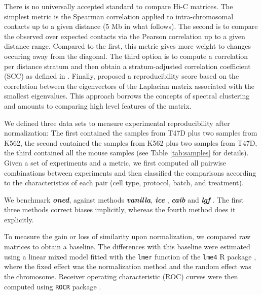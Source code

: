 \documentclass{bioinfo}
\begin{document}
\begin{methods}
There is no universally accepted standard to compare Hi-C matrices. The
simplest metric is the Spearman correlation applied to intra-chromosomal
contacts up to a given distance (5 Mb in what follows). The second is
to compare the observed over expected contacts via the Pearson correlation
up to a given distance range. Compared to the first, this metric gives
more weight to changes occuring away from the diagonal. The third option
is to compute a correlation per distance stratum and then obtain a
stratum-adjusted correlation coefficient (SCC) as defined in
\cite{yang2017hicrep}.  Finally, \cite{yan2017hicspector} proposed a
reproducibility score based on the correlation between the eigenvectors of
the Laplacian matrix associated with the smallest eigenvalues. This
approach borrows the concepts of spectral clustering
\citep{von2007tutorial} and amounts to comparing high level features of
the matrix.

We defined three data sets to measure experimental reproducibility after
normalization: The first contained the samples from T47D plus two samples
from K562, the second contained the samples from K562 plus two samples
from T47D, the third contained all the mouse samples (see Table
\ref{tab:samples} for details). Given a set of experiments and a metric,
we first computed all pairwise combinations between experiments and then
classified the comparisons according to the characteristics of each pair
(cell type, protocol, batch, and treatment).

We benchmark \textbf{\textit{oned}}, against methods
\textbf{\textit{vanilla}}, \textbf{\textit{ice}}
\citep{imakaev2012iterative}, \textbf{\textit{caib}}
\citep{wu2016computational} and \textbf{\textit{lgf}}
\citep{hu2012hicnorm, servant2012hitc}. The first three methods correct
biases implicitly, whereas the fourth method does it explicitly.

To measure the gain or loss of similarity upon normalization, we compared
raw matrices to obtain a baseline. The differences with this baseline were
estimated using a linear mixed model fitted with the \texttt{lmer}
function of the \texttt{lme4} R package \citep{bates2015lme4}, where the
fixed effect was the normalization method and the random effect was the
chromosome. Receiver operating characteristic (ROC) curves were then
computed using \texttt{ROCR} package \citep{sing2005rocr}.

\end{methods}




\end{document}
